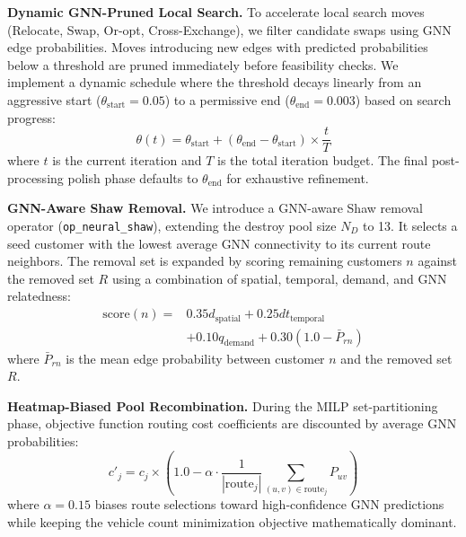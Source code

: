 \documentclass[conference]{IEEEtran}
\begin{document}
\textbf{Dynamic GNN-Pruned Local Search.}
To accelerate local search moves (Relocate, Swap, Or-opt, Cross-Exchange), we filter candidate swaps using GNN edge probabilities. Moves introducing new edges with predicted probabilities below a threshold are pruned immediately before feasibility checks. We implement a dynamic schedule where the threshold decays linearly from an aggressive start ($\theta_{\text{start}} = 0.05$) to a permissive end ($\theta_{\text{end}} = 0.003$) based on search progress:
\begin{equation}
  \theta(t) = \theta_{\text{start}} + (\theta_{\text{end}} - \theta_{\text{start}}) \times \frac{t}{T}
\end{equation}
where $t$ is the current iteration and $T$ is the total iteration budget. The final post-processing polish phase defaults to $\theta_{\text{end}}$ for exhaustive refinement.

\textbf{GNN-Aware Shaw Removal.}
We introduce a GNN-aware Shaw removal operator (\texttt{op\_neural\_shaw}), extending the destroy pool size $N_D$ to 13. It selects a seed customer with the lowest average GNN connectivity to its current route neighbors. The removal set is expanded by scoring remaining customers $n$ against the removed set $R$ using a combination of spatial, temporal, demand, and GNN relatedness:
\begin{equation}
  \begin{split}
    \text{score}(n) ={} & 0.35 d_{\text{spatial}} + 0.25 dt_{\text{temporal}} \\
    & + 0.10 q_{\text{demand}} + 0.30 \left(1.0 - \bar{P}_{rn}\right)
  \end{split}
\end{equation}
where $\bar{P}_{rn}$ is the mean edge probability between customer $n$ and the removed set $R$.

\textbf{Heatmap-Biased Pool Recombination.}
During the MILP set-partitioning phase, objective function routing cost coefficients are discounted by average GNN probabilities:
\begin{equation}
  c'_j = c_j \times \left(1.0 - \alpha \cdot \frac{1}{|\text{route}_j|} \sum_{(u, v) \in \text{route}_j} P_{uv} \right)
\end{equation}
where $\alpha = 0.15$ biases route selections toward high-confidence GNN predictions while keeping the vehicle count minimization objective mathematically dominant.


\end{document}
